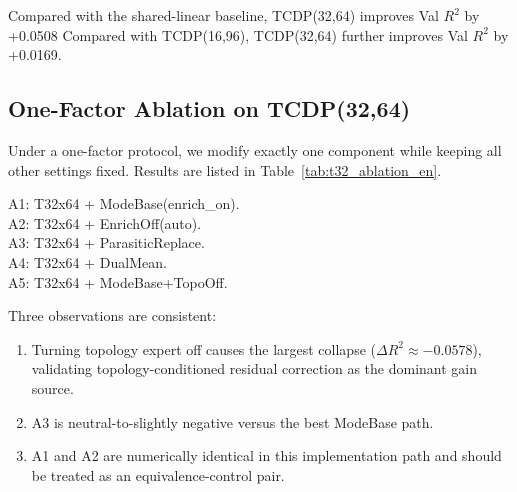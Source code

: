 ﻿\documentclass[10pt,a4paper]{article}
\begin{document}
Compared with the shared-linear baseline, TCDP(32,64) improves Val $R^2$ by +0.0508
Compared with TCDP(16,96), TCDP(32,64) further improves Val $R^2$ by +0.0169.

\subsection{One-Factor Ablation on TCDP(32,64)}

Under a one-factor protocol, we modify exactly one component while keeping all other settings fixed.
Results are listed in Table~\ref{tab:t32_ablation_en}.

\begin{table}[htbp]
\centering
\scriptsize
\setlength{\tabcolsep}{3.5pt}
\caption{One-factor ablation on TCDP(32,64) (5 seeds each).}
\label{tab:t32_ablation_en}
\vspace{2pt}
\raggedright
\footnotesize
A1: T32x64 + ModeBase(enrich\_on).\\
A2: T32x64 + EnrichOff(auto).\\
A3: T32x64 + ParasiticReplace.\\
A4: T32x64 + DualMean.\\
A5: T32x64 + ModeBase+TopoOff.
\end{table}

Three observations are consistent:
\begin{enumerate}[leftmargin=1.4em]
  \item Turning topology expert off causes the largest collapse
  ($\Delta R^2 \approx -0.0578$), validating topology-conditioned residual correction as the dominant gain source.
  \item A3 is neutral-to-slightly negative versus the best ModeBase path.
  \item A1 and A2 are numerically identical in this implementation path and should be treated as an equivalence-control pair.
\end{enumerate}
\end{document}
